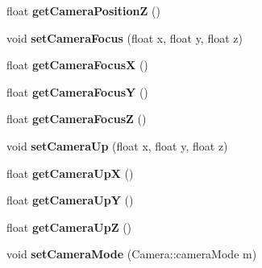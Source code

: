 \begin{DoxyCompactItemize}
\item 
\hypertarget{class_render_engine_a0cae00fa51bca7f4414dced857b2a909}{float {\bfseries get\-Camera\-Position\-Z} ()}\label{class_render_engine_a0cae00fa51bca7f4414dced857b2a909}

\item 
\hypertarget{class_render_engine_adfdba922aec083d0731ce8800a18f920}{void {\bfseries set\-Camera\-Focus} (float x, float y, float z)}\label{class_render_engine_adfdba922aec083d0731ce8800a18f920}

\item 
\hypertarget{class_render_engine_a994459d774d9020bc22286810a2dc6bb}{float {\bfseries get\-Camera\-Focus\-X} ()}\label{class_render_engine_a994459d774d9020bc22286810a2dc6bb}

\item 
\hypertarget{class_render_engine_a234ae8c0830f7798b08df87f6d2ad88d}{float {\bfseries get\-Camera\-Focus\-Y} ()}\label{class_render_engine_a234ae8c0830f7798b08df87f6d2ad88d}

\item 
\hypertarget{class_render_engine_a992122db2771284c812713a7e4dfc70c}{float {\bfseries get\-Camera\-Focus\-Z} ()}\label{class_render_engine_a992122db2771284c812713a7e4dfc70c}

\item 
\hypertarget{class_render_engine_a629a095a7453ad78e9b692e4e9522c64}{void {\bfseries set\-Camera\-Up} (float x, float y, float z)}\label{class_render_engine_a629a095a7453ad78e9b692e4e9522c64}

\item 
\hypertarget{class_render_engine_a9234c95800b9200a4296c1550c49bf26}{float {\bfseries get\-Camera\-Up\-X} ()}\label{class_render_engine_a9234c95800b9200a4296c1550c49bf26}

\item 
\hypertarget{class_render_engine_a23f3d39a74df6bdea9f133746af82a9c}{float {\bfseries get\-Camera\-Up\-Y} ()}\label{class_render_engine_a23f3d39a74df6bdea9f133746af82a9c}

\item 
\hypertarget{class_render_engine_a0e46e46650506b8972038e032835b39b}{float {\bfseries get\-Camera\-Up\-Z} ()}\label{class_render_engine_a0e46e46650506b8972038e032835b39b}

\item 
\hypertarget{class_render_engine_a4b3a40de0970e9436210076fdfb6eda0}{void {\bfseries set\-Camera\-Mode} (Camera\-::camera\-Mode m)}\label{class_render_engine_a4b3a40de0970e9436210076fdfb6eda0}


\end{DoxyCompactItemize}
